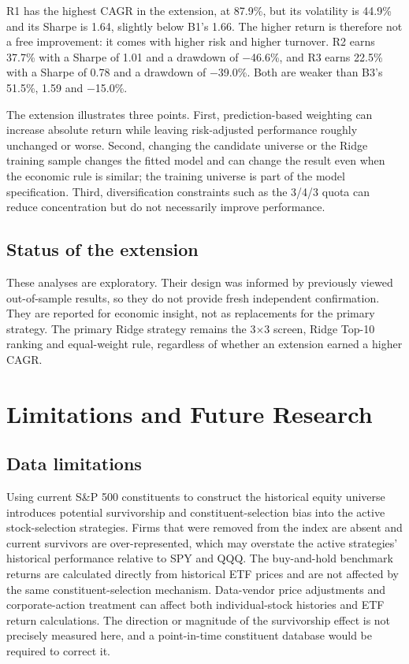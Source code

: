 \documentclass[11pt,a4paper]{article}
\begin{document}
R1 has the highest CAGR in the extension, at 87.9\%, but its volatility is 44.9\% and its Sharpe is 1.64, slightly below B1's 1.66. The higher return is therefore not a free improvement: it comes with higher risk and higher turnover. R2 earns 37.7\% with a Sharpe of 1.01 and a drawdown of $-$46.6\%, and R3 earns 22.5\% with a Sharpe of 0.78 and a drawdown of $-$39.0\%. Both are weaker than B3's 51.5\%, 1.59 and $-$15.0\%.

The extension illustrates three points. First, prediction-based weighting can increase absolute return while leaving risk-adjusted performance roughly unchanged or worse. Second, changing the candidate universe or the Ridge training sample changes the fitted model and can change the result even when the economic rule is similar; the training universe is part of the model specification. Third, diversification constraints such as the 3/4/3 quota can reduce concentration but do not necessarily improve performance.

\subsection{Status of the extension}

These analyses are exploratory. Their design was informed by previously viewed out-of-sample results, so they do not provide fresh independent confirmation. They are reported for economic insight, not as replacements for the primary strategy. The primary Ridge strategy remains the 3$\times$3 screen, Ridge Top-10 ranking and equal-weight rule, regardless of whether an extension earned a higher CAGR.


\section{Limitations and Future Research}
\label{sec:limitations}

\subsection{Data limitations}

Using current S\&P 500 constituents to construct the historical equity universe introduces potential survivorship and constituent-selection bias into the active stock-selection strategies. Firms that were removed from the index are absent and current survivors are over-represented, which may overstate the active strategies' historical performance relative to SPY and QQQ. The buy-and-hold benchmark returns are calculated directly from historical ETF prices and are not affected by the same constituent-selection mechanism. Data-vendor price adjustments and corporate-action treatment can affect both individual-stock histories and ETF return calculations. The direction or magnitude of the survivorship effect is not precisely measured here, and a point-in-time constituent database would be required to correct it.
\end{document}

